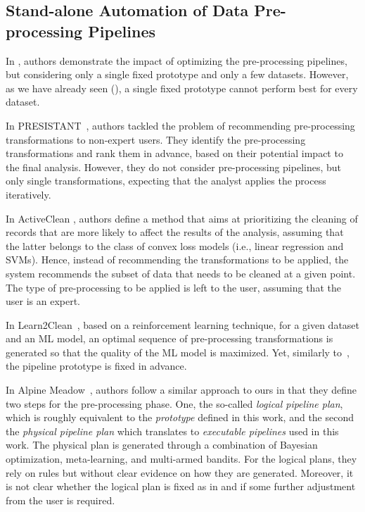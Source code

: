 \subsection{Stand-alone Automation of Data Pre-processing Pipelines}
\label{effective-ssec:dpso}

In \cite{Quemy20InfSystems}, authors demonstrate the impact of optimizing the pre-processing pipelines, but considering only a single fixed prototype and only a few datasets.
However, as we have already seen (), a single fixed prototype cannot perform best for every dataset.

In PRESISTANT~\cite{presistant18CSI,presistant18CAISE,presistant19DKE}, authors tackled the problem of recommending pre-processing transformations to non-expert users.
They identify the pre-processing transformations and rank them in advance, based on their potential impact to the final analysis.
However, they do not consider pre-processing pipelines, but only single transformations, expecting that the analyst applies the process iteratively.

In ActiveClean \cite{ActiveClean16PVLDB}, authors define a method that aims at prioritizing the cleaning of records that are more likely to affect the results of the analysis, assuming that the latter belongs to the class of convex loss models (i.e., linear regression and SVMs).
Hence, instead of recommending the transformations to be applied, the system recommends the subset of data that needs to be cleaned at a given point.
The type of pre-processing to be applied is left to the user, assuming that the user is an expert.

In Learn2Clean~\cite{Berti19WWW}, based on a reinforcement learning technique, for a given dataset and an ML model, an optimal sequence of pre-processing transformations is generated so that the quality of the ML model is maximized.
Yet, similarly to~\cite{Quemy20InfSystems}, the pipeline prototype is fixed in advance.

In Alpine Meadow~\cite{Shang19SIGMOD}, authors follow a similar approach to ours in that they define two steps for the pre-processing phase. One, the so-called \textit{logical pipeline plan}, which is roughly equivalent to the \textit{prototype} defined in this work, and the second the \textit{physical pipeline plan} which translates to \textit{executable pipelines} used in this work.
The physical plan is generated through a combination of Bayesian optimization, meta-learning, and multi-armed bandits.
For the logical plans, they rely on rules but without clear evidence on how they are generated.
Moreover, it is not clear whether the logical plan is fixed as in \cite{Quemy20InfSystems} and if some further adjustment from the user is required.

